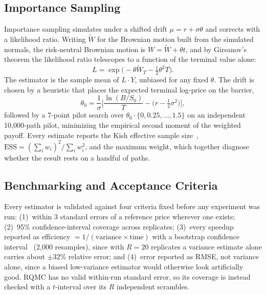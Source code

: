 \documentclass[sigconf]{acmart}
\begin{document}
\subsection{Importance Sampling}
\label{sec:is-method}
Importance sampling simulates under a shifted drift $\mu=r+\sigma\theta$ and
corrects with a likelihood ratio. Writing $\tilde W$ for the Brownian motion
built from the simulated normals, the risk-neutral Brownian motion is
$W=\tilde W+\theta t$, and by Girsanov's theorem the likelihood ratio
telescopes to a function of the terminal value alone:
\begin{equation}
  L = \exp\!\Big(-\theta \tilde W_T - \tfrac12\theta^2 T\Big).
  \label{eq:is-lr}
\end{equation}
The estimator is the sample mean of $L\cdot Y$, unbiased for any fixed
$\theta$. The drift is chosen by a heuristic that places the expected
terminal log-price on the barrier,
\begin{equation}
  \theta_0 = \frac{1}{\sigma}\Big[\frac{\ln(B/S_0)}{T} - \big(r-\tfrac12\sigma^2\big)\Big],
  \label{eq:theta0}
\end{equation}
followed by a 7-point pilot search over $\theta_0\cdot\{0,0.25,\dots,1.5\}$ on
an independent 10{,}000-path pilot, minimizing the empirical second moment of
the weighted payoff. Every estimate reports the Kish effective sample
size~\cite{Kish1965}, $\mathrm{ESS}=(\sum_i w_i)^2/\sum_i w_i^2$, and the
maximum weight, which
together diagnose whether the result rests on a handful of paths.

\subsection{Benchmarking and Acceptance Criteria}
\label{sec:acceptance}
Every estimator is validated against four criteria fixed before any
experiment was run: (1)~within 3 standard errors of a reference price
wherever one exists; (2)~95\% confidence-interval coverage across replicates;
(3)~every speedup reported as efficiency $=1/(\text{variance}\times
\text{time})$ with a bootstrap confidence interval~\cite{EfronTibshirani1993}
(2{,}000 resamples), since
with $R=20$ replicates a variance estimate alone carries about $\pm32\%$
relative error; and (4)~error reported as RMSE, not variance alone, since a
biased low-variance estimator would otherwise look artificially good. RQMC
has no valid within-run standard error, so its coverage is instead checked
with a $t$-interval over its $R$ independent scrambles.
\end{document}
